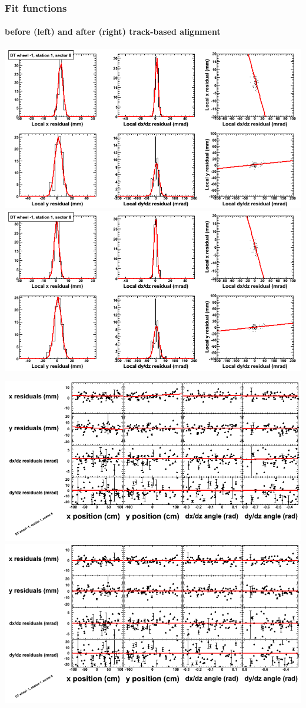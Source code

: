 \documentclass[compress]{beamer}
\begin{document}
\begin{frame}
\frametitle{Fit functions}
\framesubtitle{before (left) and after (right) track-based alignment}
\includegraphics[width=0.5\linewidth]{fitfunctions_re01/MBwhBst1sec08_bellcurves.png} \includegraphics[width=0.5\linewidth]{fitfunctions_re05/MBwhBst1sec08_bellcurves.png}

\includegraphics[width=0.5\linewidth]{fitfunctions_re01/MBwhBst1sec08_polynomials.png} \includegraphics[width=0.5\linewidth]{fitfunctions_re05/MBwhBst1sec08_polynomials.png}
\end{frame}
\end{document}
